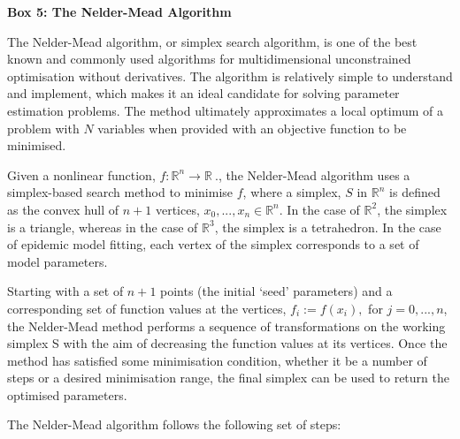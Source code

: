 \newpage
\begin{framed}
{\begin{center}{\bf Box 5: The Nelder-Mead Algorithm}\end{center}}
The Nelder-Mead algorithm, or simplex search algorithm, is one of the
best known and commonly used algorithms for multidimensional
unconstrained optimisation without derivatives. The algorithm is
relatively simple to understand and implement, which makes it an ideal
candidate for solving parameter estimation problems. The method
ultimately approximates a local optimum of a problem with $N$
variables when provided with an objective function to be minimised.

Given a nonlinear function, $f : {\mathbb
  R}^n \to {\mathbb R}\ .$, the Nelder-Mead algorithm uses a
simplex-based search method to minimise $f$, where a simplex, $S$
in ${\mathbb R}^n$ is defined as the convex hull of $n + 1$ vertices,
$x_0,...,x_n \in {\mathbb R}^n$. In the case of ${\mathbb R}^2$, the
simplex is a triangle, whereas in the case of ${\mathbb R}^3$, the
simplex is a tetrahedron. In the case of epidemic model fitting, each
vertex of the simplex corresponds to a set of model parameters.

Starting with a set of $n+1$ points (the initial `seed' parameters)
and a corresponding set of function values at the vertices, $f_i :=
f(x_i),$ for $j = 0,...,n$, the Nelder-Mead method performs a sequence
of transformations on the working simplex S with the aim of decreasing
the function values at its vertices. Once the method has satisfied
some minimisation condition, whether it be a number of steps or a
desired minimisation range, the final simplex can be used to return
the optimised parameters.

The Nelder-Mead algorithm follows the following set of
steps:


\end{framed}
